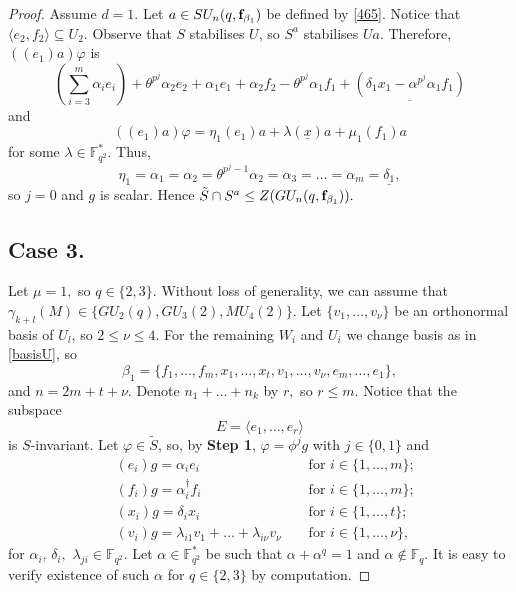 \begin{proof}
Assume $d=1.$ Let $a \in SU_n(q, {\bf f}_{\beta_1}) $ be defined by \eqref{465}. Notice that $\langle e_2, f_2 \rangle \subseteq U_2.$ Observe that $S$ stabilises  $U$, so $S^a$ stabilises $Ua.$
Therefore,  $((e_1)a)\varphi$ is
\begin{equation*}
(\sum_{i=3}^m \alpha_i e_i)+ \theta^{p^j} \alpha_2 e_2+ \alpha_1 e_1 +\alpha_2 f_2 -\theta^{p^j} \alpha_1 f_1 + \underline{(\delta_1 x_1-\alpha^{p^j} \alpha_1 f_1)}
\end{equation*}
and
$$((e_1)a)\varphi= \eta_1 (e_1)a+  \lambda (\underline{x})a+ \mu_1(f_1)a$$
 for some $\lambda \in \mathbb{F}_{q^2}^*.$ Thus,
$$\eta_1 = \alpha_1= \alpha_2 = \theta^{p^j-1}\alpha_2= \alpha_3 = \ldots =\alpha_m = \underline{\delta_1},$$ 
 so $j=0$ and $g$ is scalar. Hence $\tilde{S} \cap S^a\le Z(GU_n(q,{\bf f}_{\beta_1})).$





\subsection*{Case 3.} Let $\mu =1,$ so $q \in \{2,3\}$. Without loss of generality, we can assume that $\gamma_{k+l}(M) \in \{GU_2(q), GU_3(2), MU_4(2)\}.$  Let $\{v_1, \ldots, v_{\nu}\}$ be an orthonormal basis of $U_l$, so $2 \le \nu \le 4$. For the remaining $W_i$ and $U_i$ we change basis as in \eqref{basisU}, so  
 \begin{equation} \label{betamu}\beta_1=\{f_1, \ldots, f_m, x_1, \ldots, x_t,v_1, \ldots, v_{\nu}, e_m, \ldots, e_1\},
\end{equation}
and $n=2m+t+ \nu.$
 Denote $n_1 + \ldots + n_k$ by $r,$ so $r\le m.$ Notice that the subspace 
$$E= \langle e_1, \ldots, e_r \rangle$$
is $S$-invariant. Let $\varphi \in \tilde{S}$, so, by {\bf Step 1}, $\varphi=\phi^j g$ with $j \in \{0,1\}$ and
\begin{equation*}%
\begin{aligned}
&(e_i)g =  \alpha_i e_i & &\text{ for } i \in \{1, \ldots, m\};\\
&(f_i)g =  \alpha_i^{\dagger} f_i & &\text{ for } i \in \{1, \ldots, m\};\\
&(x_i)g =  \delta_i x_i & &\text{ for } i \in \{1, \ldots, t\}; \\
&(v_i)g =  \lambda_{i1} v_1 +\ldots + \lambda_{i \nu} v_{\nu} & & \text{ for } i \in \{1, \ldots, \nu \},
\end{aligned}
\end{equation*}
for $\alpha_i$, $\delta_i,$ $\lambda_{ji} \in \mathbb{F}_{q^2}.$ Let $\alpha \in \mathbb{F}_{q^2}^*$ be such that $\alpha + \alpha^q=1$ and $\alpha \notin \mathbb{F}_q.$ It is easy to verify existence of such $\alpha$ for $q \in \{2,3\}$ by computation.


\end{proof}
